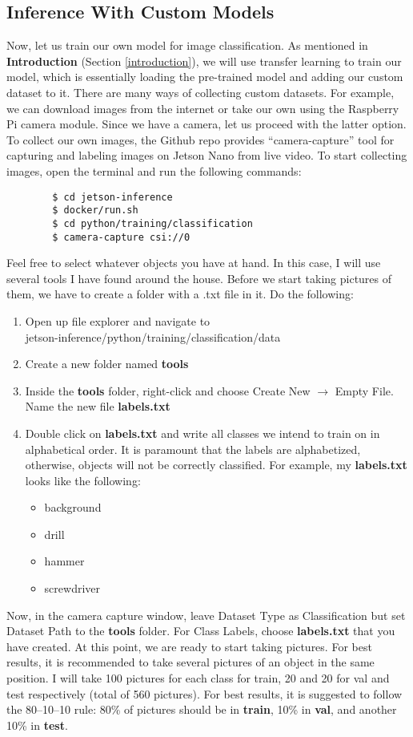 \documentclass[letter, 12pt]{article}
\begin{document}
	\subsection{Inference With Custom Models}
	\noindent Now, let us train our own model for image classification. As mentioned in \textbf{Introduction} (Section \ref{introduction}), we will use transfer learning to train our model, which is essentially loading the pre-trained model and adding our custom dataset to it. There are many ways of collecting custom datasets. For example, we can download images from the internet or take our own using the Raspberry Pi camera module. Since we have a camera, let us proceed with the latter option. To collect our own images, the Github repo provides ``camera-capture'' tool for capturing and labeling images on Jetson Nano from live video.
	To start collecting images, open the terminal and run the following commands:
	\begin{verbatim}
		$ cd jetson-inference
		$ docker/run.sh
		$ cd python/training/classification
		$ camera-capture csi://0 
	\end{verbatim}
	Feel free to select whatever objects you have at hand. In this case, I will use several tools I have found around the house. Before we start taking pictures of them, we have to create a folder with a .txt file in it. Do the following:
	\begin{enumerate}
		\item Open up file explorer and navigate to \vspace{1.5ex} \\
		jetson-inference/python/training/classification/data 
		\item Create a new folder named \textbf{tools}
		\item Inside the \textbf{tools} folder, right-click and choose Create New $\rightarrow$ Empty File. Name the new file \textbf{labels.txt}
		\newpage
		\item Double click on \textbf{labels.txt} and write all classes we intend to train on in alphabetical order. It is paramount that the labels are alphabetized, otherwise, objects will not be correctly classified. For example, my \textbf{labels.txt} looks like the following:
		\begin{itemize}[label={}]
			\item background
			\item drill
			\item hammer
			\item screwdriver
		\end{itemize}
	\end{enumerate}
	\noindent Now, in the camera capture window, leave Dataset Type as Classification but set Dataset Path to the \textbf{tools} folder. For Class Labels, choose \textbf{labels.txt} that you have created. At this point, we are ready to start taking pictures. For best results, it is recommended to take several pictures of an object in the same position. I will take 100 pictures for each class for train, 20 and 20 for val and test respectively (total of 560 pictures). For best results, it is suggested to follow the 80--10--10 rule: 80\% of pictures should be in \textbf{train}, 10\% in \textbf{val}, and another 10\% in \textbf{test}.
\end{document}
